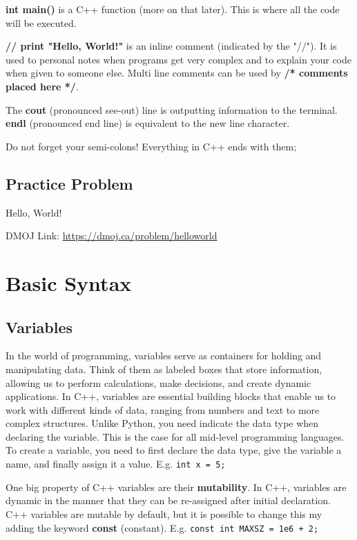 \documentclass{report}
\newcommand{\problem}[2]{
    \begin{problembox}
        #1
        
        DMOJ Link: \href{#2}{#2}
    \end{problembox}
}
\begin{document}
\textbf{int main()} is a C++ function (more on that later). This is where all the code will be executed. 

\textbf{// print "Hello, World!"} is an inline comment (indicated by the "//"). It is used to personal notes when programs get very complex and to explain your code when given to someone else. Multi line comments can be used by \textbf{/* comments placed here */}.

The \textbf{cout} (pronounced see-out) line is outputting information to the terminal. \textbf{endl} (pronounced end line) is equivalent to the new line character.

\begin{note}
    Do not forget your semi-colons! Everything in C++ ends with them;
\end{note}

\subsection*{Practice Problem}

\problem{Hello, World!}{https://dmoj.ca/problem/helloworld}

\newpage
\section{Basic Syntax}
\subsection{Variables}
In the world of programming, variables serve as containers for holding and manipulating data. Think of them as labeled boxes that store information, allowing us to perform calculations, make decisions, and create dynamic applications. In C++, variables are essential building blocks that enable us to work with different kinds of data, ranging from numbers and text to more complex structures. Unlike Python, you need indicate the data type when declaring the variable. This is the case for all mid-level programming languages. To create a variable, you need to first declare the data type, give the variable a name, and finally assign it a value. E.g. \lstinline{int x = 5;}

One big property of C++ variables are their \textbf{mutability}. In C++, variables are dynamic in the manner that they can be re-assigned after initial declaration. C++ variables are mutable by default, but it is possible to change this my adding the keyword \textbf{const} (constant). E.g. \lstinline{const int MAXSZ = 1e6 + 2;} \newline
\end{document}
